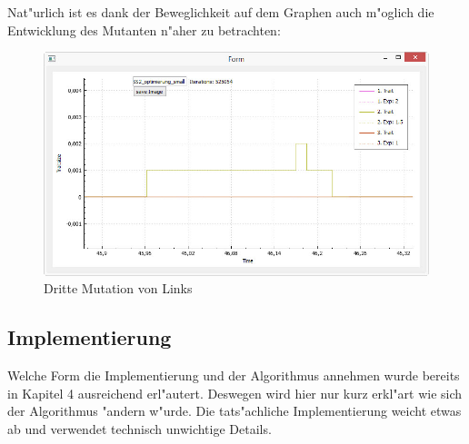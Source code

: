 \documentclass[11pt, a4paper, german]{article}
\theoremstyle{plain}
\begin{document}
	Nat"urlich ist es dank der Beweglichkeit auf dem Graphen auch m"oglich die Entwicklung des Mutanten n"aher zu betrachten:
	\begin{figure}[H]
		\centering
		\includegraphics[width=1\linewidth]{./Pictures/TSS_MutationZoom2_original}
		\caption{Dritte Mutation von Links}
		\label{TSS_MutationZoom2_original}
	\end{figure}
	
	\subsection{Implementierung}
	Welche Form die Implementierung und der Algorithmus annehmen wurde bereits in Kapitel 4 ausreichend erl"autert. Deswegen wird hier nur kurz erkl"art wie sich der Algorithmus "andern w"urde. Die tats"achliche Implementierung weicht etwas ab und verwendet technisch unwichtige Details.\\
	
\end{document}
